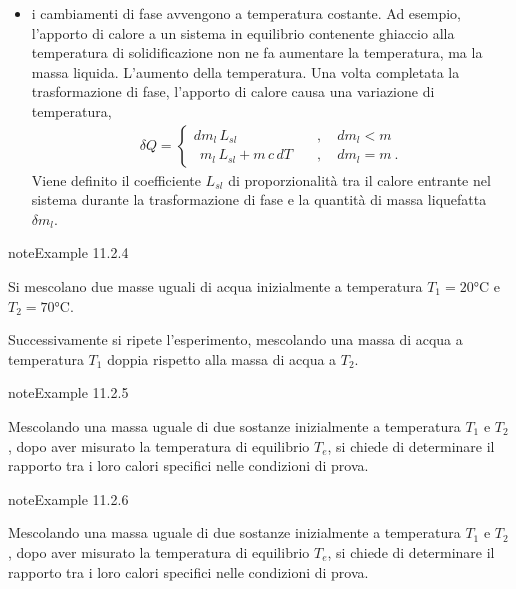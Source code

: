 \documentclass[letterpaper,10pt,italian]{jupyterBook}
\begin{document}
\begin{itemize}
\item {} 
\sphinxAtStartPar
i cambiamenti di fase avvengono a temperatura costante. Ad esempio, l’apporto di calore a un sistema in equilibrio contenente ghiaccio alla temperatura di solidificazione non ne fa aumentare la temperatura, ma la massa liquida. L’aumento della temperatura. Una volta completata la trasformazione di fase, l’apporto di calore causa una variazione di temperatura,
\begin{equation*}
\begin{split}\delta Q = \begin{cases}
      d m_{l} \, L_{sl}                 \quad & , \quad {d m_l < m} \\
    \ \ m_{l} \, L_{sl} + m \, c \, d T \quad & , \quad {d m_l = m} \ .
    \end{cases}\end{split}
\end{equation*}
\sphinxAtStartPar
Viene definito  il coefficiente \(L_{sl}\) di proporzionalità tra il calore entrante nel sistema durante la trasformazione di fase e la quantità di massa liquefatta \(\delta m_l\).

\end{itemize}
\label{ch/thermodynamics/foundation-experiments:example-4}
\begin{sphinxadmonition}{note}{Example 11.2.4}



\sphinxAtStartPar
Si mescolano due masse uguali di acqua inizialmente a temperatura \(T_1 = 20 \text{°C}\) e \(T_2 = 70 \text{°C}\).

\sphinxAtStartPar
Successivamente si ripete l’esperimento, mescolando una massa di acqua a temperatura \(T_1\) doppia rispetto alla massa di acqua a \(T_2\).
\end{sphinxadmonition}
\label{ch/thermodynamics/foundation-experiments:example-5}
\begin{sphinxadmonition}{note}{Example 11.2.5}



\sphinxAtStartPar
Mescolando una massa uguale di due sostanze inizialmente a temperatura \(T_1\)  e \(T_2\), dopo aver misurato la temperatura di equilibrio \(T_e\), si chiede di determinare il rapporto tra i loro calori specifici nelle condizioni di prova.
\end{sphinxadmonition}
\label{ch/thermodynamics/foundation-experiments:example-6}
\begin{sphinxadmonition}{note}{Example 11.2.6}



\sphinxAtStartPar
Mescolando una massa uguale di due sostanze inizialmente a temperatura \(T_1\)  e \(T_2\), dopo aver misurato la temperatura di equilibrio \(T_e\), si chiede di determinare il rapporto tra i loro calori specifici nelle condizioni di prova.
\end{sphinxadmonition}
\end{document}
